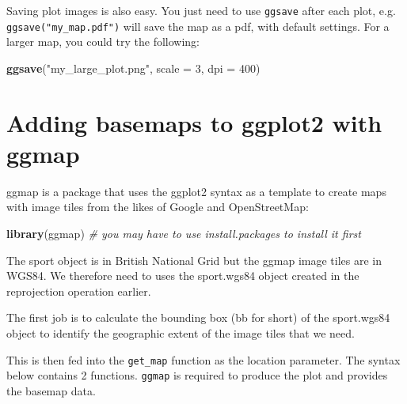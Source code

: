 \documentclass[]{article}
\newenvironment{Shaded}{}{}
\newcommand{\KeywordTok}[1]{\textcolor[rgb]{0.00,0.44,0.13}{\textbf{{#1}}}}
\newcommand{\DataTypeTok}[1]{\textcolor[rgb]{0.56,0.13,0.00}{{#1}}}
\newcommand{\DecValTok}[1]{\textcolor[rgb]{0.25,0.63,0.44}{{#1}}}
\newcommand{\FloatTok}[1]{\textcolor[rgb]{0.25,0.63,0.44}{{#1}}}
\newcommand{\StringTok}[1]{\textcolor[rgb]{0.25,0.44,0.63}{{#1}}}
\newcommand{\CommentTok}[1]{\textcolor[rgb]{0.38,0.63,0.69}{\textit{{#1}}}}
\newcommand{\NormalTok}[1]{{#1}}
\begin{document}
Saving plot images is also easy. You just need to use \texttt{ggsave}
after each plot, e.g. \texttt{ggsave("my\_map.pdf")} will save the map
as a pdf, with default settings. For a larger map, you could try the
following:

\begin{Shaded}
\begin{Highlighting}[]
\KeywordTok{ggsave}\NormalTok{(}\StringTok{"my_large_plot.png"}\NormalTok{, }\DataTypeTok{scale =} \DecValTok{3}\NormalTok{, }\DataTypeTok{dpi =} \DecValTok{400}\NormalTok{)}
\end{Highlighting}
\end{Shaded}
\section{Adding basemaps to ggplot2 with ggmap}

ggmap is a package that uses the ggplot2 syntax as a template to create
maps with image tiles from the likes of Google and OpenStreetMap:

\begin{Shaded}
\begin{Highlighting}[]
\KeywordTok{library}\NormalTok{(ggmap)  }\CommentTok{# you may have to use install.packages to install it first}
\end{Highlighting}
\end{Shaded}
The sport object is in British National Grid but the ggmap image tiles
are in WGS84. We therefore need to uses the sport.wgs84 object created
in the reprojection operation earlier.

The first job is to calculate the bounding box (bb for short) of the
sport.wgs84 object to identify the geographic extent of the image tiles
that we need.

\begin{Shaded}
\end{Shaded}
This is then fed into the \texttt{get\_map} function as the location
parameter. The syntax below contains 2 functions. \texttt{ggmap} is
required to produce the plot and provides the basemap data.
\end{document}

